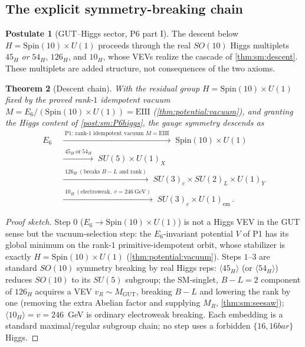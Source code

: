 \documentclass[11pt]{article}
\theoremstyle{plain}
\newtheorem{theorem}{Theorem}[section]
\theoremstyle{definition}
\newtheorem{postulate}[theorem]{Postulate}
\theoremstyle{remark}
\begin{document}
\subsection{The explicit symmetry-breaking chain}
\label{sec:sm:descent}

\begin{postulate}[GUT--Higgs sector, P6 part I]\label{post:sm:P6higgs}
The descent below $H=\mathrm{Spin}(10)\times U(1)$ proceeds through the real
$SO(10)$ Higgs multiplets $45_H$ \emph{or} $54_H$, $126_H$, and $10_H$, whose VEVs
realize the cascade of \autoref{thm:sm:descent}. These multiplets are added
structure, not consequences of the two axioms.
\end{postulate}

\begin{theorem}[Descent chain]\label{thm:sm:descent}
With the residual group $H=\mathrm{Spin}(10)\times U(1)$ fixed by the proved
rank-$1$ idempotent vacuum $M=E_6/(\mathrm{Spin}(10)\times U(1))=\mathrm{EIII}$
(\autoref{thm:potential:vacuum}), and granting the Higgs content of
\autoref{post:sm:P6higgs}, the gauge symmetry descends as
\begin{equation}\label{eq:sm:chain}
\begin{aligned}
E_6
 &\;\xrightarrow{\;\text{P1: rank-}1\text{ idempotent vacuum }M=\mathrm{EIII}\;}\;
 \mathrm{Spin}(10)\times U(1) \\
 &\;\xrightarrow{\;45_H\ \text{or}\ 54_H\;}\;
 SU(5)\times U(1)_X \\
 &\;\xrightarrow{\;126_H\ (\text{breaks }B\!-\!L\text{ and rank})\;}\;
 SU(3)_c\times SU(2)_L\times U(1)_Y \\
 &\;\xrightarrow{\;10_H\ (\text{electroweak},\ v=246\ \mathrm{GeV})\;}\;
 SU(3)_c\times U(1)_{\mathrm{em}}\,.
\end{aligned}
\end{equation}
\end{theorem}

\begin{proof}[Proof sketch]
Step $0$ ($E_6\to \mathrm{Spin}(10)\times U(1)$) is not a Higgs VEV in the GUT sense
but the vacuum-selection step: the $E_6$-invariant potential $V$ of P1 has its global
minimum on the rank-$1$ primitive-idempotent orbit, whose stabilizer is exactly
$H=\mathrm{Spin}(10)\times U(1)$ (\autoref{thm:potential:vacuum}). Steps $1$--$3$
are standard $SO(10)$ symmetry breaking by real Higgs reps: $\langle 45_H\rangle$ (or
$\langle 54_H\rangle$) reduces $SO(10)$ to its $SU(5)$ subgroup; the SM-singlet,
$B\!-\!L=2$ component of $126_H$ acquires a VEV $v_R\sim M_{\mathrm{GUT}}$, breaking
$B\!-\!L$ and lowering the rank by one (removing the extra Abelian factor and supplying
$M_R$, \autoref{thm:sm:seesaw}); $\langle 10_H\rangle=v=246$~GeV is ordinary
electroweak breaking. Each embedding is a standard maximal/regular subgroup chain;
no step uses a forbidden $\{16,16bar\}$ Higgs.
\end{proof}
\end{document}

